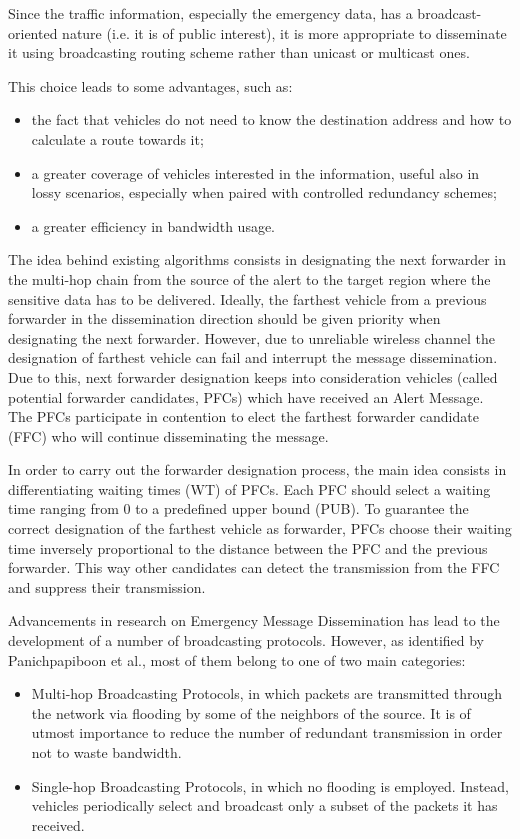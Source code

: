 		
		Since the traffic information, especially the emergency data, has a broadcast-oriented nature (i.e. it is of public interest), it is more appropriate to disseminate it using broadcasting routing scheme rather than unicast or multicast ones. \cite{5989903}
		
		This choice leads to some advantages, such as:
		\begin{itemize}
			\item the fact that vehicles do not need to know the destination address and how to calculate a route towards it;
			\item a greater coverage of vehicles interested in the information, useful also in lossy scenarios, especially when paired with controlled redundancy schemes;
			\item a greater efficiency in bandwidth usage.
		\end{itemize}
		
		The idea behind existing algorithms consists in designating the next forwarder in the multi-hop chain from the source of the alert to the target region where the sensitive data has to be delivered. Ideally, the farthest vehicle from a previous forwarder in the dissemination direction should be given priority when designating the next forwarder. However, due to unreliable wireless channel the designation of farthest vehicle can fail and interrupt the message dissemination. Due to this, next forwarder designation keeps into consideration vehicles (called potential forwarder candidates, PFCs) which have received an Alert Message. The PFCs participate in contention to elect the farthest forwarder candidate (FFC) who will continue disseminating the message.
		
		
		In order to carry out the forwarder designation process, the main idea consists in differentiating waiting times (WT) of PFCs. Each PFC should select a waiting time ranging from 0 to a predefined upper bound (PUB). To guarantee the correct designation of the farthest vehicle as forwarder, PFCs choose their waiting time inversely proportional to the distance between the PFC and the previous forwarder. This way other candidates can detect the transmission from the FFC and suppress their transmission.
		
		Advancements in research on Emergency Message Dissemination has lead to the development of a number of broadcasting protocols. However, as identified by Panichpapiboon et al.\cite{5989903}, most of them belong to one of two main categories:
		\begin{itemize}
			\item Multi-hop Broadcasting Protocols, in which packets are transmitted through the network via flooding by some of the neighbors of the source. It is of utmost importance to reduce the number of redundant transmission in order not to waste bandwidth.
			\item Single-hop Broadcasting Protocols, in which no flooding is employed. Instead, vehicles periodically select and broadcast only a subset of the packets it has received.
		\end{itemize}
		
